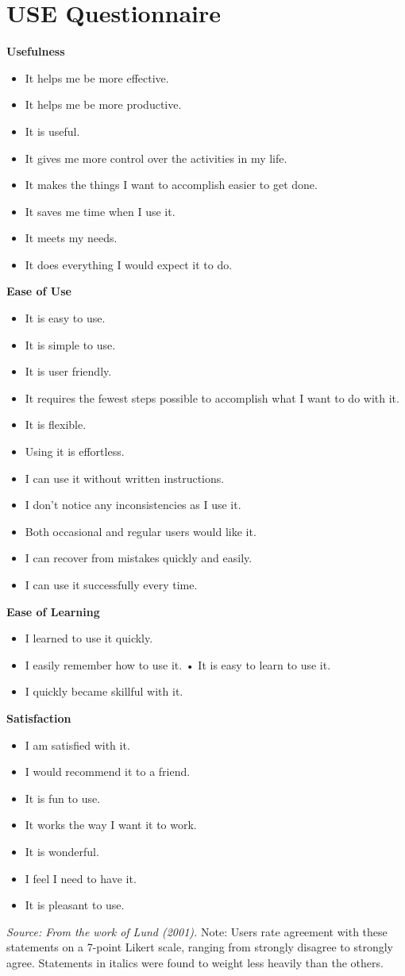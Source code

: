 \chapter{USE Questionnaire}\label{appendixb}
\begin{singlespace}
\small
\textbf{Usefulness}
\begin{itemize}
\item It helps me be more effective.
\item It helps me be more productive.
\item It is useful.
\item It gives me more control over the activities in my life.
\item It makes the things I want to accomplish easier to get done.
\item It saves me time when I use it.
\item It meets my needs.
\item It does everything I would expect it to do.
\end{itemize}
\small
\textbf{Ease of Use}
\begin{itemize}
\item It is easy to use.
\item It is simple to use.
\item It is user friendly.
\item It requires the fewest steps possible to accomplish what I want to do with it.
\item It is flexible.
\item Using it is effortless.
\item I can use it without written instructions.
\item I don't notice any inconsistencies as I use it.
\item Both occasional and regular users would like it.
\item I can recover from mistakes quickly and easily.
\item I can use it successfully every time.
\end{itemize}
\small
\textbf{Ease of Learning}
\begin{itemize}
\item I learned to use it quickly.
\item I easily remember how to use it. • It is easy to learn to use it.
\item I quickly became skillful with it.
\end{itemize}
\small
\textbf{Satisfaction}
\begin{itemize}
\item I am satisfied with it.
\item I would recommend it to a friend. 
\item It is fun to use.
\item It works the way I want it to work.
\item It is wonderful.
\item I feel I need to have it.
\item It is pleasant to use.
\end{itemize}
\small
\end{singlespace}
\textit{Source: From the work of Lund (2001).}
Note: Users rate agreement with these statements on a 7-point Likert
scale, ranging from strongly disagree to strongly agree. Statements in
italics were found to weight less heavily than the others.

